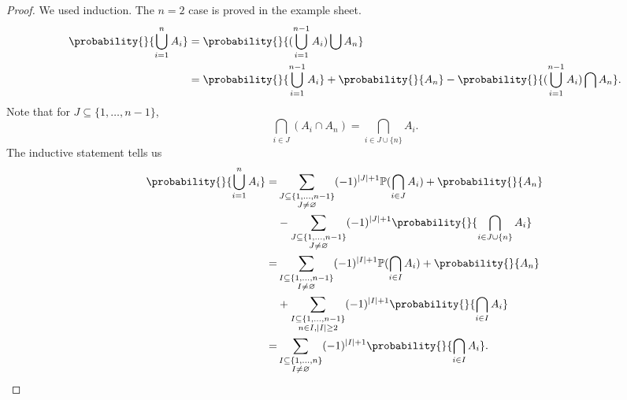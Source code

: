 \begin{proof}
    We used induction. The \(n = 2\) case is proved in the example sheet.
    \begin{align*}
        \probability{}{\bigcup_{i=1}^n A_i} &= \probability{}{(\bigcup_{i=1}^{n-1}A_i)\bigcup A_n}\\
        &= \probability{}{\bigcup_{i=1}^{n-1}A_i} + \probability{}{A_n} -\probability{}{(\bigcup_{i=1}^{n-1}A_i)\bigcap A_n}.
    \end{align*}
    Note that for \(J \subseteq \{1, \ldots ,n-1 \}\),
    \[
        \bigcap_{i\in J}(A_i\cap A_{n})=\bigcap_{i\in J\cup \{n\}}A_i.
    \]
    The inductive statement tells us
    \begin{align*}
        \probability{}{\bigcup_{i=1}^n A_i} =& \sum\limits_{\substack{J\subseteq \{1, \ldots ,n-1 \}\\ J \neq \varnothing}} (-1)^{\left\vert J \right\vert +1} \mathbb{\MakeUppercase{p}}(\bigcap_{i\in J}A_i) + \probability{}{A_n}\\
        &- \sum\limits_{\substack{J\subseteq \{1, \ldots , n - 1 \}\\ J \neq \varnothing }}(-1)^{\left\vert J \right\vert +1}\probability{}{\bigcap_{i\in J \cup \{n\}}A_i}\\
        =& \sum\limits_{\substack{I\subseteq \{1, \ldots ,n-1 \}\\ I \neq \varnothing}} (-1)^{\left\vert I \right\vert +1} \mathbb{\MakeUppercase{p}}(\bigcap_{i\in I}A_i) + \probability{}{A_n}\\
        &+ \sum\limits_{\substack{I\subseteq \{1, \ldots , n - 1 \}\\ n\in I, \left\vert I \right\vert \geq 2}}(-1)^{\left\vert I \right\vert +1}\probability{}{\bigcap_{i\in I}A_i}\\
        =& \sum\limits_{\substack{I \subseteq \{1, \ldots ,n \}\\ I \neq \varnothing}} (-1)^{\left\vert I \right\vert +1} \probability{}{\bigcap_{i\in I}A_i}.
    \end{align*}
\end{proof}
